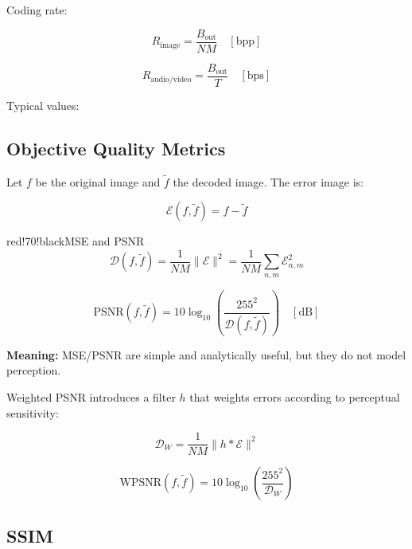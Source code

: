 Coding rate:

\[
R_{\text{image}} = \frac{B_{\text{out}}}{NM} \quad [\text{bpp}]
\]

\[
R_{\text{audio/video}} = \frac{B_{\text{out}}}{T} \quad [\text{bps}]
\]

Typical values:

\begin{center}
\end{center}

\subsection{Objective Quality Metrics}

Let $f$ be the original image and $\tilde{f}$ the decoded image. The error image is:

\[
\mathcal{E}(f,\tilde{f}) = f-\tilde{f}
\]

\begin{calloutbox}{red!70!black}{MSE and PSNR}
\[
\mathcal{D}(f,\tilde{f}) =
\frac{1}{NM}\|\mathcal{E}\|^2 =
\frac{1}{NM}\sum_{n,m}\mathcal{E}_{n,m}^2
\]

\[
\text{PSNR}(f,\tilde{f}) =
10\log_{10}\left(\frac{255^2}{\mathcal{D}(f,\tilde{f})}\right)
\quad [\text{dB}]
\]

\textbf{Meaning:} MSE/PSNR are simple and analytically useful, but they do not model perception.
\end{calloutbox}

Weighted PSNR introduces a filter $h$ that weights errors according to perceptual sensitivity:

\[
\mathcal{D}_W = \frac{1}{NM}\|h * \mathcal{E}\|^2
\]

\[
\text{WPSNR}(f,\tilde{f}) =
10\log_{10}\left(\frac{255^2}{\mathcal{D}_W}\right)
\]

\subsection{SSIM}

